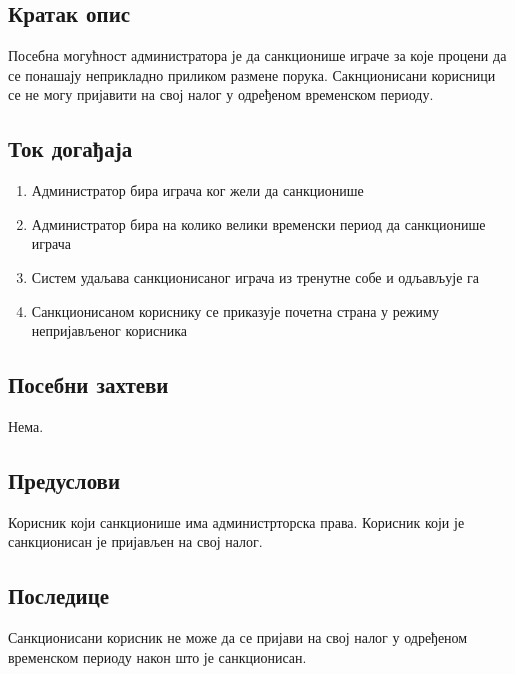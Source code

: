 \subsection{Кратак опис}
Посебна могућност администратора је да санкционише играче за које процени да се понашају
неприкладно приликом размене порука. Сакнционисани корисници се не могу пријавити на свој
налог у одређеном временском периоду.

\subsection{Ток догађаја}
\begin{enumerate}
	\item Администратор бира играча ког жели да санкционише
    \item Администратор бира на колико велики временски период да санкционише играча
	\item Систем удаљава санкционисаног играча из тренутне собе и одљављује га
	\item Санкционисаном кориснику се приказује почетна страна у режиму непријављеног
	      корисника
\end{enumerate}


\subsection{Посебни захтеви}
Нема.

\subsection{Предуслови}
Корисник који санкционише има администрторска права.
Корисник који је санкционисан је пријављен на свој налог.

\subsection{Последице}
Санкционисани корисник не може да се пријави на свој налог у одређеном временском периоду
након што је санкционисан.
